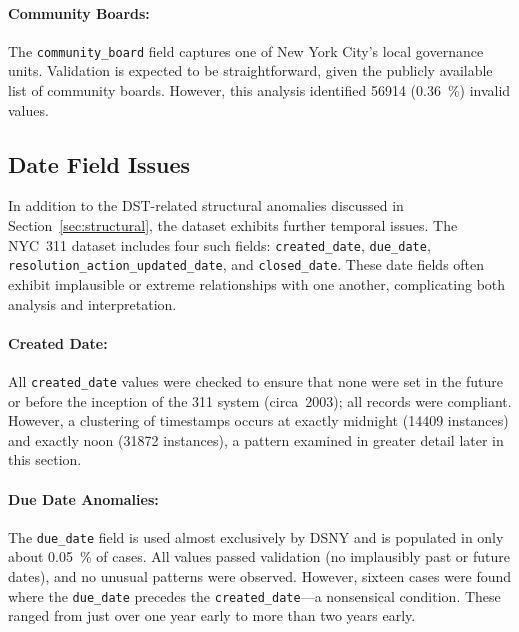 \documentclass[linenumber]{jdsart}
\begin{document}
\paragraph{Community Boards:}
\label{sec:communityboardissues}
The \texttt{community\_board} field captures one of New York City’s
local governance units. Validation is expected to be straightforward,
given the publicly available list of community boards. However,
this analysis identified \num{56914}
(\SI[round-mode=places, round-precision=2]{0.36}{\percent})
invalid values.



\subsection{Date Field Issues}
\label{subsec:datefieldissues}
In addition to the DST-related structural anomalies discussed in
Section~\ref{sec:structural}, the dataset exhibits further temporal 
issues. The NYC~311 dataset includes four such fields:
\texttt{created\_date}, \texttt{due\_date}, \texttt{resolution\_action\_updated\_date}, and
\texttt{closed\_date}. These date fields often exhibit implausible or extreme
relationships with one another, complicating both analysis
and interpretation.


\paragraph{Created Date:}
\label{sec:createddate}
All \texttt{created\_date} values were checked to ensure that none were set in
the future or before the inception of the 311 system (circa~2003); all records
were compliant. However, a clustering of timestamps occurs at exactly
midnight (\num{14409} instances) and exactly noon
(\num{31872} instances), a pattern examined in greater
detail later in this section.


\paragraph{Due Date Anomalies:}
\label{par:duedate}
The \texttt{due\_date} field is used almost exclusively by \textsc{DSNY} 
and is populated in only about
\SI[round-precision = 2]{0.05}{\percent} of cases. All values passed validation
(no implausibly past or future dates), and no unusual patterns were observed.
However, sixteen cases were found where the \texttt{due\_date} precedes the
\texttt{created\_date}—a nonsensical condition. These ranged from just over
one year early to more than two years early. 
\end{document}
